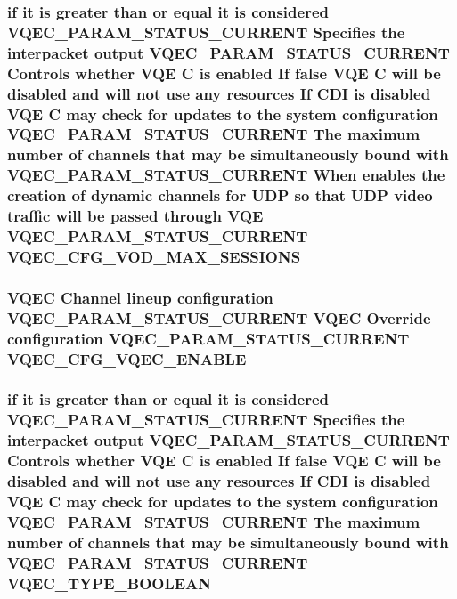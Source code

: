 \subsubsection{\setlength{\rightskip}{0pt plus 5cm}if it is greater than or equal it is considered VQEC\_\-PARAM\_\-STATUS\_\-CURRENT Specifies the interpacket output VQEC\_\-PARAM\_\-STATUS\_\-CURRENT Controls whether VQE \bf{C} is enabled If false VQE \bf{C} will be disabled and will not use any resources If CDI is disabled VQE \bf{C} may check for updates \bf{to} the system configuration VQEC\_\-PARAM\_\-STATUS\_\-CURRENT The maximum number of \bf{channels} that may be simultaneously bound with VQEC\_\-PARAM\_\-STATUS\_\-CURRENT When enables the creation of dynamic \bf{channels} for UDP so that UDP video traffic will be passed through VQE VQEC\_\-PARAM\_\-STATUS\_\-CURRENT \bf{VQEC\_\-CFG\_\-VOD\_\-MAX\_\-SESSIONS}}\label{vqec__cfg__settings_8h_cf3ced7860579b834bb419f375de75b3}


\subsubsection{\setlength{\rightskip}{0pt plus 5cm}VQEC Channel lineup configuration VQEC\_\-PARAM\_\-STATUS\_\-CURRENT VQEC Override configuration VQEC\_\-PARAM\_\-STATUS\_\-CURRENT \bf{VQEC\_\-CFG\_\-VQEC\_\-ENABLE}}\label{vqec__cfg__settings_8h_0e2ce77a43bc04ba1425d4adf49bb22e}


\subsubsection{\setlength{\rightskip}{0pt plus 5cm}if it is greater than or equal it is considered VQEC\_\-PARAM\_\-STATUS\_\-CURRENT Specifies the interpacket output VQEC\_\-PARAM\_\-STATUS\_\-CURRENT Controls whether VQE \bf{C} is enabled If false VQE \bf{C} will be disabled and will not use any resources If CDI is disabled VQE \bf{C} may check for updates \bf{to} the system configuration VQEC\_\-PARAM\_\-STATUS\_\-CURRENT The maximum number of \bf{channels} that may be simultaneously bound with VQEC\_\-PARAM\_\-STATUS\_\-CURRENT \bf{VQEC\_\-TYPE\_\-BOOLEAN}}\label{vqec__cfg__settings_8h_b4739c5f95f4c03fb9b6686fd9d82742}



